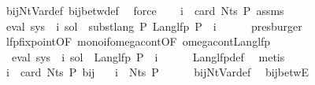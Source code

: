 \begin{isabellebody}
\ bij{\isacharunderscore}{\kern0pt}Nt{\isacharunderscore}{\kern0pt}Var{\isacharunderscore}{\kern0pt}def\ bij{\isacharunderscore}{\kern0pt}betw{\isacharunderscore}{\kern0pt}def\ \isamarkupfalse%
\ force\isanewline
\ \ \isamarkupfalse%
\ {\isacartoucheopen}i\ {\isacharless}{\kern0pt}\ card\ {\isacharparenleft}{\kern0pt}Nts\ P{\isacharparenright}{\kern0pt}{\isacartoucheclose}\ assms\ \isamarkupfalse%
\ {\isachardoublequoteopen}eval\ {\isacharparenleft}{\kern0pt}sys\ {\isacharbang}{\kern0pt}\ i{\isacharparenright}{\kern0pt}\ sol\ {\isacharequal}{\kern0pt}\ subst{\isacharunderscore}{\kern0pt}lang\ P\ {\isacharparenleft}{\kern0pt}Lang{\isacharunderscore}{\kern0pt}lfp\ P{\isacharparenright}{\kern0pt}\ {\isacharparenleft}{\kern0pt}{\isasymgamma}\ i{\isacharparenright}{\kern0pt}{\isachardoublequoteclose}\isanewline
\ \ \ \ \isamarkupfalse%
\ presburger\isanewline
\ \ \isamarkupfalse%
\ lfp{\isacharunderscore}{\kern0pt}fixpoint{\isacharbrackleft}{\kern0pt}OF\ mono{\isacharunderscore}{\kern0pt}if{\isacharunderscore}{\kern0pt}omega{\isacharunderscore}{\kern0pt}cont{\isacharbrackleft}{\kern0pt}OF\ omega{\isacharunderscore}{\kern0pt}cont{\isacharunderscore}{\kern0pt}Lang{\isacharunderscore}{\kern0pt}lfp{\isacharbrackright}{\kern0pt}{\isacharbrackright}{\kern0pt}\ \isamarkupfalse%
\ {}{\isacharcolon}{\kern0pt}\ {\isachardoublequoteopen}eval\ {\isacharparenleft}{\kern0pt}sys\ {\isacharbang}{\kern0pt}\ i{\isacharparenright}{\kern0pt}\ sol\ {\isacharequal}{\kern0pt}\ Lang{\isacharunderscore}{\kern0pt}lfp\ P\ {\isacharparenleft}{\kern0pt}{\isasymgamma}\ i{\isacharparenright}{\kern0pt}{\isachardoublequoteclose}\isanewline
\ \ \ \ \isamarkupfalse%
\ Lang{\isacharunderscore}{\kern0pt}lfp{\isacharunderscore}{\kern0pt}def\ \isamarkupfalse%
\ metis\isanewline
\ \ \isamarkupfalse%
\ {\isacartoucheopen}i\ {\isacharless}{\kern0pt}\ card\ {\isacharparenleft}{\kern0pt}Nts\ P{\isacharparenright}{\kern0pt}{\isacartoucheclose}\ bij{\isacharunderscore}{\kern0pt}{\isasymgamma}{\isacharunderscore}{\kern0pt}{\isasymgamma}{\isacharprime}{\kern0pt}\ \isamarkupfalse%
\ {\isachardoublequoteopen}{\isasymgamma}\ i\ {\isasymin}\ Nts\ P{\isachardoublequoteclose}\isanewline
\ \ \ \ \isamarkupfalse%
\ bij{\isacharunderscore}{\kern0pt}Nt{\isacharunderscore}{\kern0pt}Var{\isacharunderscore}{\kern0pt}def\ \isamarkupfalse%
\ bij{\isacharunderscore}{\kern0pt}betwE\ \isamarkupfalse%

\end{isabellebody}
